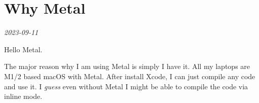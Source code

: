 \documentclass[12pt,letterpaper]{article}
\newcommand{\draftdate}[1]{\vspace{-2.0em}\hfill\emph{\small{#1}}\par}
\begin{document}
\section*{Why Metal}
\draftdate{2023-09-11}
Hello Metal.

The major reason why I am using Metal is simply I have it. All my laptops are
M1/2 based macOS with Metal. After install Xcode, I can just compile any code
and use it. I \emph{guess} even without Metal I might be able to compile the
code via inline mode.
\end{document}
